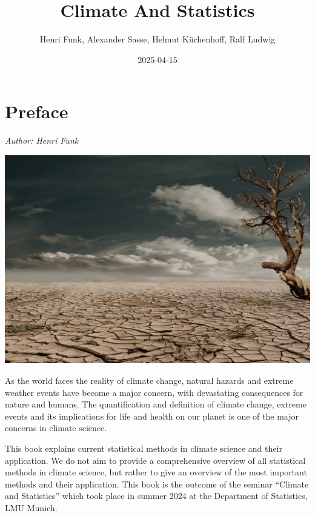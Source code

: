 \documentclass[
]{krantz}
\title{Climate And Statistics}
\author{Henri Funk, Alexander Sasse, Helmut Küchenhoff, Ralf Ludwig}
\date{2025-04-15}
\begin{document}
\maketitle


\thispagestyle{empty}

\begin{center}
\end{center}

\setlength{\abovedisplayskip}{-5pt}
\setlength{\abovedisplayshortskip}{-5pt}

{
\hypersetup{linkcolor=}
\setcounter{tocdepth}{0}
\tableofcontents
}
\chapter*{Preface}\label{preface}


\emph{Author: Henri Funk}

\begin{center}\includegraphics[width=0.75\linewidth]{cover} \end{center}

As the world faces the reality of climate change, natural hazards and extreme weather events have become a major concern, with devastating consequences for nature and humans. The quantification and definition of climate change, extreme events and its implications for life and health on our planet is one of the major concerns in climate science.

This book explains current statistical methods in climate science and their application.
We do not aim to provide a comprehensive overview of all statistical methods in climate science, but rather to give an overview of the most important methods and their application.
This book is the outcome of the seminar ``Climate and Statistics'' which took place in summer 2024 at the Department of Statistics, LMU Munich.
\end{document}
